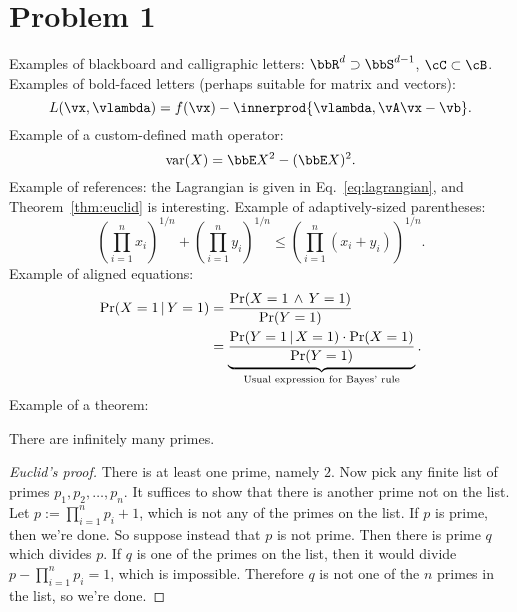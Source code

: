 \documentclass[twoside,11pt]{homework}
\date{**add date here**} %
\begin{document}
\maketitle

\section*{Problem 1}


Examples of blackboard and calligraphic letters: $\bbR^d \supset
\bbS^{d-1}$, $\cC \subset \cB$.
Examples of bold-faced letters (perhaps suitable for matrix and
vectors):
\begin{equation}
  L(\vx,\vlambda) = f(\vx) - \innerprod{\vlambda,\vA\vx-\vb} .
  \label{eq:lagrangian}
\end{equation}
\newcommand\var{\ensuremath{\operatorname{var}}}%
Example of a custom-defined math operator:
\[
  \var(X) = \bbE X^2 - (\bbE X)^2 .
\]
Example of references: the Lagrangian is given in
Eq.~\eqref{eq:lagrangian}, and Theorem~\ref{thm:euclid} is
interesting.
Example of adaptively-sized parentheses:
\[
  \left(\prod_{i=1}^n x_i\right)^{1/n}
  + \left(\prod_{i=1}^n y_i\right)^{1/n}
  \leq
  \left(\prod_{i=1}^n (x_i + y_i)\right)^{1/n}
  .
\]
Example of aligned equations:
\begin{align}
  \Pr(X = 1 \,|\, Y = 1)
  & = \frac{\Pr(X = 1 \,\wedge\, Y = 1)}{\Pr(Y = 1)}
  \notag \\
  & =
  \underbrace{
    \frac{\Pr(Y = 1 \,|\, X = 1) \cdot \Pr(X = 1)}{\Pr(Y = 1)}
  }_{\text{Usual expression for Bayes' rule}}
  .
  \label{eq:bayes-rule}
\end{align}
Example of a theorem:
\begin{theorem}[Euclid]
  \label{thm:euclid}
  There are infinitely many primes.
\end{theorem}
\begin{proof}[Euclid's proof]
  There is at least one prime, namely $2$.
  Now pick any finite list of primes $p_1, p_2, \dotsc, p_n$.
  It suffices to show that there is another prime not on the list.
  Let $p := \prod_{i=1}^n p_i + 1$, which is not any of the primes on
  the list.
  If $p$ is prime, then we're done.
  So suppose instead that $p$ is not prime.
  Then there is prime $q$ which divides $p$.
  If $q$ is one of the primes on the list, then it would divide $p -
  \prod_{i=1}^n p_i = 1$, which is impossible.
  Therefore $q$ is not one of the $n$ primes in the list, so we're
  done.
\end{proof}
\end{document}
